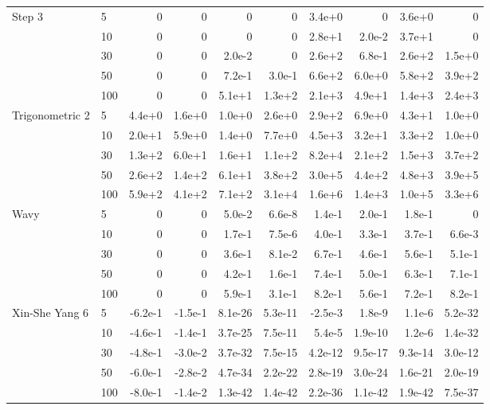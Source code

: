 {\begin{longtable}{llrrrrrrrr}
\midrule
\multirow{5}{*}{Step 3} & 5 & 0 & 0 & 0 & 0 & 3.4e{+}0 & 0 & 3.6e{+}0 & 0 \\*
 & 10 & 0 & 0 & 0 & 0 & 2.8e{+}1 & 2.0e{-}2 & 3.7e{+}1 & 0 \\*
 & 30 & 0 & 0 & 2.0e{-}2 & 0 & 2.6e{+}2 & 6.8e{-}1 & 2.6e{+}2 & 1.5e{+}0 \\*
 & 50 & 0 & 0 & 7.2e{-}1 & 3.0e{-}1 & 6.6e{+}2 & 6.0e{+}0 & 5.8e{+}2 & 3.9e{+}2 \\*
 & 100 & 0 & 0 & 5.1e{+}1 & 1.3e{+}2 & 2.1e{+}3 & 4.9e{+}1 & 1.4e{+}3 & 2.4e{+}3 \\
\midrule
\multirow{5}{*}{Trigonometric 2} & 5 & 4.4e{+}0 & 1.6e{+}0 & 1.0e{+}0 & 2.6e{+}0 & 2.9e{+}2 & 6.9e{+}0 & 4.3e{+}1 & 1.0e{+}0 \\*
 & 10 & 2.0e{+}1 & 5.9e{+}0 & 1.4e{+}0 & 7.7e{+}0 & 4.5e{+}3 & 3.2e{+}1 & 3.3e{+}2 & 1.0e{+}0 \\*
 & 30 & 1.3e{+}2 & 6.0e{+}1 & 1.6e{+}1 & 1.1e{+}2 & 8.2e{+}4 & 2.1e{+}2 & 1.5e{+}3 & 3.7e{+}2 \\*
 & 50 & 2.6e{+}2 & 1.4e{+}2 & 6.1e{+}1 & 3.8e{+}2 & 3.0e{+}5 & 4.4e{+}2 & 4.8e{+}3 & 3.9e{+}5 \\*
 & 100 & 5.9e{+}2 & 4.1e{+}2 & 7.1e{+}2 & 3.1e{+}4 & 1.6e{+}6 & 1.4e{+}3 & 1.0e{+}5 & 3.3e{+}6 \\
\midrule
\multirow{5}{*}{Wavy} & 5 & 0 & 0 & 5.0e{-}2 & 6.6e{-}8 & 1.4e{-}1 & 2.0e{-}1 & 1.8e{-}1 & 0 \\*
 & 10 & 0 & 0 & 1.7e{-}1 & 7.5e{-}6 & 4.0e{-}1 & 3.3e{-}1 & 3.7e{-}1 & 6.6e{-}3 \\*
 & 30 & 0 & 0 & 3.6e{-}1 & 8.1e{-}2 & 6.7e{-}1 & 4.6e{-}1 & 5.6e{-}1 & 5.1e{-}1 \\*
 & 50 & 0 & 0 & 4.2e{-}1 & 1.6e{-}1 & 7.4e{-}1 & 5.0e{-}1 & 6.3e{-}1 & 7.1e{-}1 \\*
 & 100 & 0 & 0 & 5.9e{-}1 & 3.1e{-}1 & 8.2e{-}1 & 5.6e{-}1 & 7.2e{-}1 & 8.2e{-}1 \\
\midrule
\multirow{5}{*}{Xin-She Yang 6} & 5 & -6.2e{-}1 & -1.5e{-}1 & 8.1e{-}26 & 5.3e{-}11 & -2.5e{-}3 & 1.8e{-}9 & 1.1e{-}6 & 5.2e{-}32 \\*
 & 10 & -4.6e{-}1 & -1.4e{-}1 & 3.7e{-}25 & 7.5e{-}11 & 5.4e{-}5 & 1.9e{-}10 & 1.2e{-}6 & 1.4e{-}32 \\*
 & 30 & -4.8e{-}1 & -3.0e{-}2 & 3.7e{-}32 & 7.5e{-}15 & 4.2e{-}12 & 9.5e{-}17 & 9.3e{-}14 & 3.0e{-}12 \\*
 & 50 & -6.0e{-}1 & -2.8e{-}2 & 4.7e{-}34 & 2.2e{-}22 & 2.8e{-}19 & 3.0e{-}24 & 1.6e{-}21 & 2.0e{-}19 \\*
 & 100 & -8.0e{-}1 & -1.4e{-}2 & 1.3e{-}42 & 1.4e{-}42 & 2.2e{-}36 & 1.1e{-}42 & 1.9e{-}42 & 7.5e{-}37 \\
\end{longtable}
}
